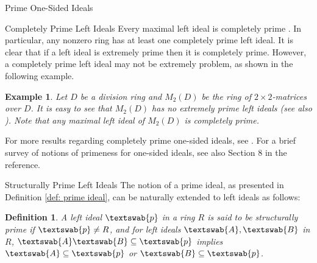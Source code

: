 \documentclass[11pt,a4paper]{article}
\theoremstyle{theorem}
\newtheorem{definition}{Definition}[section]
\newtheorem{example}{Example}[section]
\numberwithin{equation}{section}
\begin{document}
\begin{section}{Prime One-Sided Ideals}
\begin{subsection}{Completely Prime Left Ideals}
	Every maximal left ideal is completely prime  \cite[Corollary 2.10]{reyes2010one}. In particular, any nonzero ring has at least one completely prime left ideal. 
	It is clear that if a  left ideal is extremely prime then it is completely prime. However, a completely  prime left ideal may not be extremely problem, as shown in the following example. 
	\begin{example}\label{exam: extremely and completely}
		Let \(D\) be a division ring and \(M_2(D)\) be the ring of \(2\times 2\)-matrices over \(D\). It is easy to see that \(M_2(D)\) has no extremely prime left ideals (see also \cite[Proposition 2.4]{reyes2010one}). Note that any maximal left ideal of  \(M_2(D)\) is completely prime. 
	\end{example}
	For more results regarding completely prime one-sided ideals, see \cite{reyes2012noncommutative}. For a brief survey of notions of primeness for one-sided ideals, see also Section 8 in the reference. 
	
\end{subsection}
 
\begin{subsection}{Structurally Prime Left Ideals}
 	The notion of a prime ideal, as presented in Definition \ref{def: prime ideal}, can be naturally extended to left ideals as follows:   
 \begin{definition}\label{def: structurally prime left ideal}
 	A left ideal  \( \textswab{p} \) in a  ring \( R \) is said to be \emph{structurally prime} if \( \textswab{p} \neq R \), and  for left ideals \( \textswab{A},\textswab{B}\) in \(R\), \( \textswab{A}\textswab{B}\subseteq\textswab{p}\) implies \( \textswab{A}\subseteq\textswab{p}\) or \( \textswab{B}\subseteq\textswab{p}\).
 \end{definition}


\end{subsection}
\end{section}
\end{document}
